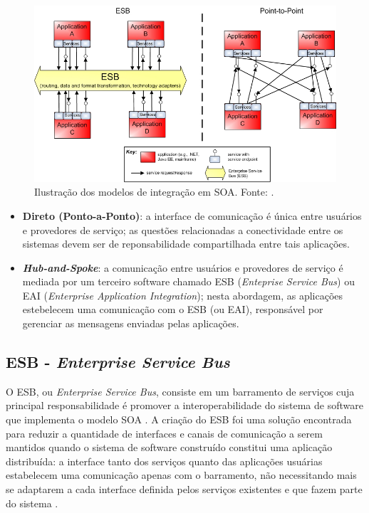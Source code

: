\begin{figure}[htb]
\centering
\includegraphics[scale=0.7]{figuras/modelos_integracao_soa.png}
\caption{Ilustração dos modelos de integração em SOA. Fonte: \cite{Bianco2007}.}
\label{modelos_integracao_soa}
\end{figure}

\begin{itemize}
\item \textbf{Direto (Ponto-a-Ponto)}: a interface de comunicação é única entre usuários e provedores de serviço; as questões relacionadas a conectividade entre os sistemas devem ser de reponsabilidade compartilhada entre tais aplicações.
\item \textbf{\textit{Hub-and-Spoke}}: a comunicação entre usuários e provedores de serviço é mediada por um terceiro software chamado ESB (\textit{Enteprise Service Bus}) ou EAI (\textit{Enterprise Application Integration}); nesta abordagem, as aplicações estebelecem uma comunicação com o ESB (ou EAI), responsável por gerenciar as mensagens enviadas pelas aplicações.
\end{itemize}

\subsection{ESB - \textit{Enterprise Service Bus}}

O ESB, ou \textit{Enterprise Service Bus}, consiste em um barramento de serviços cuja principal responsabilidade é promover a interoperabilidade do sistema de software que implementa o modelo SOA \cite{josuttis_soa_2007}. A criação do ESB foi uma solução encontrada para reduzir a quantidade de interfaces e canais de comunicação a serem mantidos quando o sistema de software construído constitui uma aplicação distribuída: a interface tanto dos serviços quanto das aplicações usuárias estabelecem uma comunicação apenas com o barramento, não necessitando mais se adaptarem a cada interface definida pelos serviços existentes e que fazem parte do sistema \cite{josuttis_soa_2007}.

